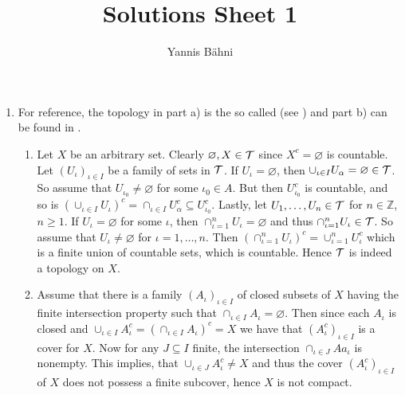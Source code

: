

\title{Solutions Sheet 1}
\author{Yannis B\"{a}hni}
\address[Yannis B\"{a}hni]{University of Zurich, R\"{a}mistrasse 71, 8006 Zurich}


\maketitle
\thispagestyle{fancy}

\begin{enumerate}[label = \textbf{Exercise \arabic*.},wide = 0pt, itemsep=1.5ex]
\item For reference, the topology in part a) is the so called  (see \cite[45]{lee:topological_manifolds:2011}) and part b) can be found in \cite[169]{munkres:topology:2000}.
	\begin{enumerate}[label = \alph*),wide = 0pt, itemsep=1.5ex]
		\item Let $X$ be an arbitrary set. Clearly $\varnothing,X \in \mathcal{T}$ since $X^c = \varnothing$ is countable. Let $(U_\iota)_{\iota \in I}$ be a family of sets in $\mathcal{T}$. If $U_\iota = \varnothing$, then $\cup_{\iota \in I} U_\alpha = \varnothing \in \mathcal{T}$. So assume that $U_{\iota_0} \neq \varnothing$ for some $\iota_0 \in A$. But then $U^c_{\iota_0}$ is countable, and so is $(\cup_{\iota \in I} U_\iota)^c = \cap_{\iota \in I}U_\alpha^c \subseteq U^c_{\iota_0}$. Lastly, let $U_1,\dots,U_n \in \mathcal{T}$ for $n\in \mathbb{Z}$, $n \geq 1$. If $U_\iota = \varnothing$ for some $\iota$, then $\cap_{\iota = 1}^n U_\iota = \varnothing$ and thus $\cap_{\iota = 1}^n U_\iota \in \mathcal{T}$. So assume that $U_\iota \neq \varnothing$ for $\iota = 1,\dots,n$. Then $(\cap_{\iota = 1}^n U_\iota)^c = \cup_{\iota = 1}^n U_\iota^c$ which is a finite union of countable sets, which is countable. Hence $\mathcal{T}$ is indeed a topology on $X$.
		\item Assume that there is a family $(A_\iota)_{\iota \in I}$ of closed subsets of $X$ having the finite intersection property such that $\cap_{\iota \in I} A_\iota = \varnothing$. Then since each $A_\iota$ is closed and $\cup_{\iota \in I} A^c_\iota = (\cap_{\iota \in I} A_\iota)^c = X$ we have that $(A^c_\iota)_{\iota \in I}$ is a cover for $X$. Now for any $J \subseteq I$ finite, the intersection $\cap_{\iota \in J} Aa_\iota$ is nonempty. This implies, that $\cup_{\iota \in J} A_\iota^c \neq X$ and thus the cover $(A^c_\iota)_{\iota \in I}$ of $X$ does not possess a finite subcover, hence $X$ is not compact.\\

\end{enumerate}
\end{enumerate}
